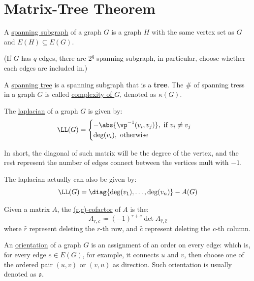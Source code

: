 \section{Matrix-Tree Theorem}

\begin{definition}
	A \underline{spanning subgraph} of a graph \( G \) is a graph \( H \) with the same vertex set as \( G \) and \( E(H) \subseteq E(G) \).

	(If \( G \) has \( q \) edges, there are \( 2^q \) spanning subgraph, in particular, choose whether each edges are included in.)
\end{definition}

\begin{definition}
	A \underline{spanning tree} is a spanning subgraph that is a \textbf{tree}. The \# of spanning tress in a graph \( G \) is called \underline{complexity of \( G \)}, denoted as \( \kappa(G) \).
\end{definition}

\begin{definition}
	\label{def:laplacian}
	The \underline{laplacian} of a graph \( G \) is given by:
	\[
		\LL (G) = \begin{cases}
			- \abs{\vp^{-1}(v_i, v_j)}, \text{ if } v_i \ne v_j \\
			\deg(v_i), \text{ otherwise}
		\end{cases}
	\]

	In short, the diagonal of such matrix will be the degree of the vertex, and the rest represent the number of edges connect between the vertices mult with \( -1 \).
\end{definition}

\begin{note}
	The laplacian actually can also be given by:
	\[
		\LL(G) = \diag\{\deg(v_1), \ldots, \deg(v_n)\}  - A(G)
	\]
\end{note}

\begin{definition}
	Given a matrix \( A \), the \underline{(r,c)-cofactor} of \( A \) is the:
	\[
		A_{r,c}\coloneqq  (-1)^{r+c} \det A_{\hat{r}, \hat{c}  }
	\]
	where \( \hat{r} \) represent deleting the \( r \)-th row, and \( \hat{c} \) represent deleting the \( c \)-th column.
\end{definition}

\begin{definition}
	An \underline{orientation} of a graph \( G \) is an assignment of an order on every edge: which is, for every edge \( e\in E(G) \), for example, it connects \( u \) and \( v \), then choose one of the ordered pair \( (u,v) \) or \( (v,u) \) as direction. Such orientation is usually denoted as \( \mathfrak o \).
\end{definition}

